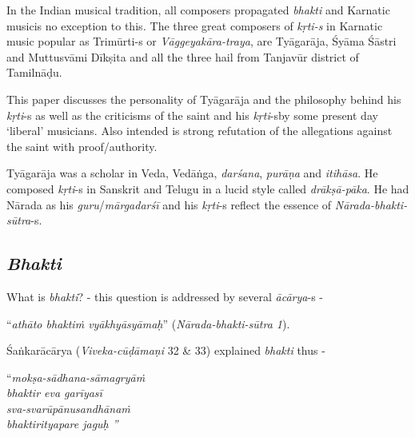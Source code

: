 In the Indian musical tradition, all composers propagated \textit{bhakti} and Karnatic musicis no exception to this\textit{. }The three great composers of \textit{kṛti-s} in Karnatic music popular as Trimūrti-s or \textit{Vāggeyakāra-traya}, are Tyāgarāja, Śyāma Śāstri and Muttusvāmi Dīkṣita and all the three hail from Tanjavūr district of Tamilnāḍu. 

This paper discusses the personality of Tyāgarāja and the philosophy behind his \textit{kṛti}-s as well as the criticisms of the saint and his \textit{kṛti}-s\break by some present day ‘liberal’ musicians. Also intended is strong refutation of the allegations against the saint with proof/authority.

Tyāgarāja was a scholar in Veda, Vedāṅga, \textit{darśana}, \textit{purāṇa} and \textit{itihāsa}. He composed \textit{kṛti}-s in Sanskrit and Telugu in a lucid style called \textit{drākṣā-pāka}. He had Nārada as his \textit{guru}/\textit{mārgadarśī} and his \textit{kṛti}-s reflect the essence of \textit{Nārada-bhakti-sūtra}-s.

\vspace{-.4cm}

\subsection*{\textit{Bhakti}}

\vspace{-.2cm}

What is \textit{bhakti}? - this question is addressed by several \textit{ācārya}-s - 

“\textit{athāto bhaktiṁ vyākhyāsyāmaḥ}” (\textit{Nārada-bhakti-sūtra 1}).

Śaṅkarācārya (\textit{Viveka-cūḍāmaṇi} 32 \& 33) explained \textit{bhakti} thus -

\begin{centerquote}
“\textit{mokṣa-sādhana-sāmagryāṁ}\\ \textit{bhaktir eva garīyasī }\\ \textit{sva-svarūpānusandhānaṁ}\\ \textit{bhaktirityapare jaguḥ ”}
\end{centerquote}

